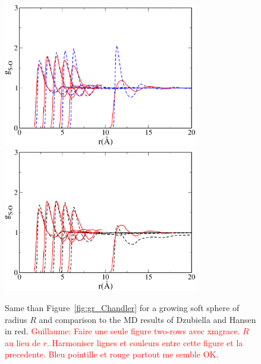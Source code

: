 \documentclass[aip,jcp,preprint]{revtex4-1}
\begin{document}
\begin{figure}
    \includegraphics[width=8.5cm]{gHANSEN_HSB_SPC.pdf}\\
    \includegraphics[width=8.5cm]{gHANSEN_VdW_a12p3_m0p9_SPC.pdf}
    \caption{
        \label{fig:gr_Hansen}
        Same than Figure~\ref{fig:gr_Chandler} for a growing soft sphere of radius $R$ and comparison to the MD results of Dzubiella and Hansen\cite{dzubiella04} in red. \textcolor{red}{Guillaume: Faire une seule figure two-rows avec xmgrace. $R$ au lieu de $r$. Harmoniser lignes et couleurs entre cette figure et la precedente. Bleu pointille et rouge partout me semble OK. }
        }
\end{figure}
\end{document}
